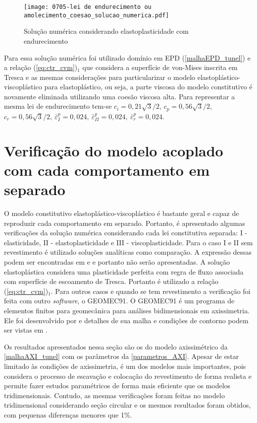 \begin{figure}[H]
	\begin{center}
		\texttt{[image: 0705-lei de endurecimento ou amolecimento\_coesao\_solucao\_numerica.pdf]}
	\end{center}
	\caption{\label{solucao_numérica_LAJSS}Solução numérica considerando elastoplasticidade com endurecimento}
\end{figure}
Para essa solução numérica foi utilizado domínio em EPD (\autoref{malhaEPD_tunel}) e a relação (\ref{eq:ctr_cvm})$_1$ que considera a superfície de von-Mises inscrita em Tresca e as mesmas considerações para particularizar o modelo elastoplástico-viscoplástico para elastoplástico, ou seja, a parte viscosa do modelo constitutivo é novamente eliminada utilizando uma coesão viscosa alta. Para representar a mesma lei de endurecimento tem-se $c_i = 0,21\sqrt{3}/2$, $c_p = 0,56\sqrt{3}/2$, $c_r = 0,56\sqrt{3}/2,~\bar \varepsilon^p_{I} = 0,024,~\bar \varepsilon^p_{II} = 0,024,~\bar \varepsilon^p_{r} = 0,024$. 

\section{Verificação do modelo acoplado com cada comportamento em separado}
O modelo constitutivo elastoplástico-viscoplástico é bastante geral e capaz de reproduzir cada comportamento em separado. Portanto, é apresentado algumas verificações da solução numérica considerando cada lei constitutiva separada: I - elasticidade, II - elastoplasticidade e III - viscoplasticidade. Para o caso I e II sem revestimento é utilizado soluções analíticas como comparação. A expressão dessas podem ser encontradas em  e  e portanto não serão apresentadas. A solução elastoplástica considera uma plasticidade perfeita com regra de fluxo associada com superfície de escoamento de Tresca. Portanto é utilizado a relação (\ref{eq:ctr_cvm})$_1$. Para outros casos e quando se tem revestimento a verificação foi feita com outro \textit{software}, o GEOMEC91. O GEOMEC91 é um programa de elementos finitos para geomecânica para análises bidimensionais em axissimetria. Ele foi desenvolvido por  e detalhes de sua malha e condições de contorno podem ser vistas em .

Os resultados apresentados nessa seção são os do modelo axissimétrico da \autoref{malhaAXI_tunel} com os parâmetros da \autoref{parametros_AXI}. Apesar de estar limitado às condições de axissimetria, é um dos modelos mais importantes, pois considera o processo de escavação e colocação do revestimento de forma realista e permite fazer estudos paramétricos de forma mais eficiente que os modelos tridimensionais. Contudo, as mesmas verificações foram feitas no modelo tridimensional considerando seção circular e os mesmos resultados foram obtidos, com pequenas diferenças menores que 1\%.

